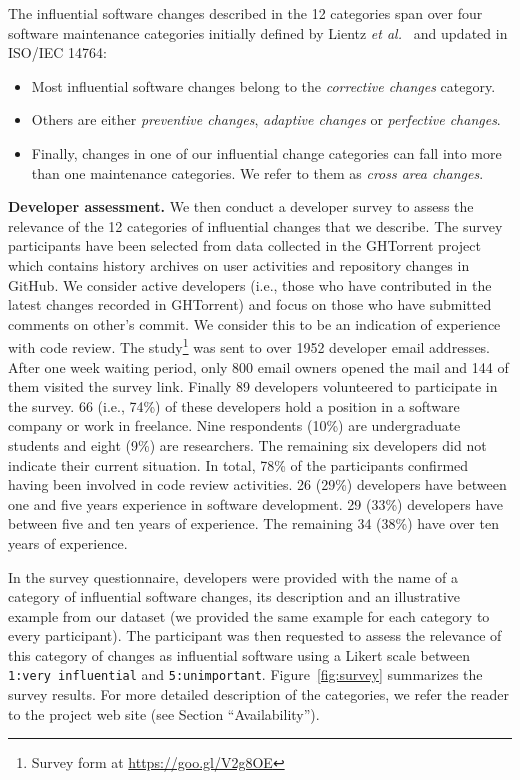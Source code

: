 The influential software changes described in the 12 categories span over
four software maintenance categories initially defined by Lientz {\em et
al.}~\cite{Lientz:1978:CAS:359511.359522} and updated in ISO/IEC 14764:
\begin{itemize}
	\item  Most influential software changes belong to the {\em corrective changes} category.
	\item  Others are either {\em preventive changes}, {\em adaptive changes} or {\em perfective changes}.
	\item  Finally, changes in one of our influential change categories can fall into more than one maintenance categories. We refer to them as {\em cross area changes}.
\end{itemize}
  


\newpage
\textbf{Developer assessment.}
We then conduct a developer survey to assess the relevance of the 12 categories of influential changes that we describe. 
The survey participants have been selected from data collected in the GHTorrent project~\cite{Gousi13} which contains history
archives on user activities and repository changes in GitHub. We consider active developers (i.e., those who have contributed in the latest changes recorded in GHTorrent) and focus on those who have submitted comments on other's commit. We consider this to be an indication of experience with code review. The study\footnote{Survey form at \url{https://goo.gl/V2g8OE}} was sent to over 1952 developer email addresses. After one week waiting period, only 800 email owners opened the mail and 144 of them visited the survey link. Finally 89 developers volunteered to participate in the survey. 66 (i.e., 74\%) of these developers hold a position in a software company or work in freelance. Nine respondents (10\%) are undergraduate students and eight (9\%) are researchers. The remaining six developers did not indicate their current situation. In total, 78\% of the participants confirmed having been involved in code review activities. 26 (29\%) developers have between one and five years experience in software development. 29 (33\%) developers have between five and ten years of experience. The remaining 34 (38\%) have over ten years of experience. 

In the survey questionnaire, developers were provided with the name of a category of influential software changes, its description and an illustrative example from our dataset (we provided the same example for each category to every participant). The participant was then requested to assess the relevance of this category of changes as influential software using a Likert scale between {\tt 1:very influential} and {\tt 5:unimportant}. Figure~\ref{fig:survey} summarizes the survey results. For more detailed description of the categories, we refer the reader to the project web site (see Section ``Availability'').

